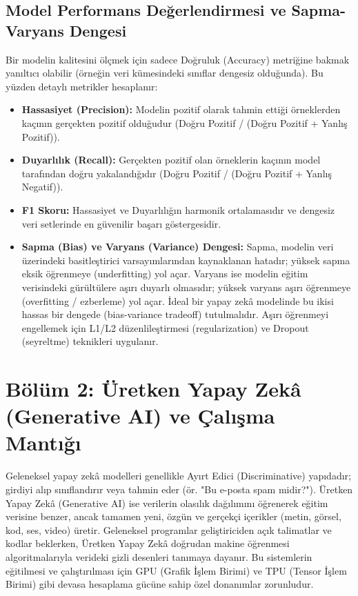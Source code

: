 \documentclass[11pt,a4paper,openany]{book}
\begin{document}
\subsection{Model Performans Değerlendirmesi ve Sapma-Varyans Dengesi}
Bir modelin kalitesini ölçmek için sadece Doğruluk (Accuracy) metriğine bakmak yanıltıcı olabilir (örneğin veri kümesindeki sınıflar dengesiz olduğunda). Bu yüzden detaylı metrikler hesaplanır:
\begin{itemize}
    \item \textbf{Hassasiyet (Precision):} Modelin pozitif olarak tahmin ettiği örneklerden kaçının gerçekten pozitif olduğudur (Doğru Pozitif / (Doğru Pozitif + Yanlış Pozitif)).
    \item \textbf{Duyarlılık (Recall):} Gerçekten pozitif olan örneklerin kaçının model tarafından doğru yakalandığıdır (Doğru Pozitif / (Doğru Pozitif + Yanlış Negatif)).
    \item \textbf{F1 Skoru:} Hassasiyet ve Duyarlılığın harmonik ortalamasıdır ve dengesiz veri setlerinde en güvenilir başarı göstergesidir.
    \item \textbf{Sapma (Bias) ve Varyans (Variance) Dengesi:} Sapma, modelin veri üzerindeki basitleştirici varsayımlarından kaynaklanan hatadır; yüksek sapma eksik öğrenmeye (underfitting) yol açar. Varyans ise modelin eğitim verisindeki gürültülere aşırı duyarlı olmasıdır; yüksek varyans aşırı öğrenmeye (overfitting / ezberleme) yol açar. İdeal bir yapay zekâ modelinde bu ikisi hassas bir dengede (bias-variance tradeoff) tutulmalıdır. Aşırı öğrenmeyi engellemek için L1/L2 düzenlileştirmesi (regularization) ve Dropout (seyreltme) teknikleri uygulanır.
\end{itemize}

\newpage
\section{Bölüm 2: Üretken Yapay Zekâ (Generative AI) ve Çalışma Mantığı}
Geleneksel yapay zekâ modelleri genellikle Ayırt Edici (Discriminative) yapıdadır; girdiyi alıp sınıflandırır veya tahmin eder (ör. "Bu e-posta spam midir?"). Üretken Yapay Zekâ (Generative AI) ise verilerin olasılık dağılımını öğrenerek eğitim verisine benzer, ancak tamamen yeni, özgün ve gerçekçi içerikler (metin, görsel, kod, ses, video) üretir. Geleneksel programlar geliştiriciden açık talimatlar ve kodlar beklerken, Üretken Yapay Zekâ doğrudan makine öğrenmesi algoritmalarıyla verideki gizli desenleri tanımaya dayanır. Bu sistemlerin eğitilmesi ve çalıştırılması için GPU (Grafik İşlem Birimi) ve TPU (Tensor İşlem Birimi) gibi devasa hesaplama gücüne sahip özel donanımlar zorunludur.
\end{document}
